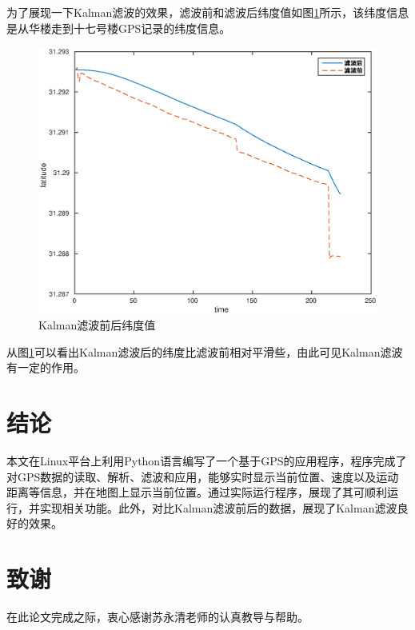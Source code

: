 \documentclass[a4paper, 12pt]{article}
\begin{document}
为了展现一下Kalman滤波的效果，滤波前和滤波后纬度值如图\ref{fig:kal}所示，该纬度信息是从华楼走到十七号楼GPS记录的纬度信息。
\begin{figure}[ht]
  \centering
  \includegraphics[width=15cm]{kal.eps}
  \caption{Kalman滤波前后纬度值}
  \label{fig:kal}
\end{figure}
从图\ref{fig:kal}可以看出Kalman滤波后的纬度比滤波前相对平滑些，由此可见Kalman滤波有一定的作用。

\section{结论}
本文在Linux平台上利用Python语言编写了一个基于GPS的应用程序，程序完成了对GPS数据的读取、解析、滤波和应用，能够实时显示当前位置、速度以及运动距离等信息，并在地图上显示当前位置。通过实际运行程序，展现了其可顺利运行，并实现相关功能。此外，对比Kalman滤波前后的数据，展现了Kalman滤波良好的效果。

\section*{致谢}
在此论文完成之际，衷心感谢苏永清老师的认真教导与帮助。


\end{document}
